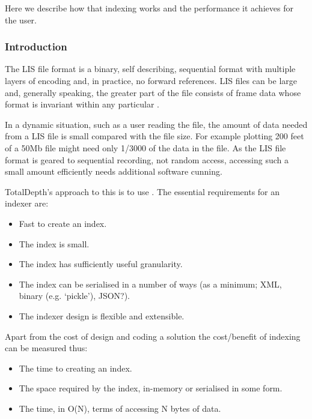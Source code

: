 \documentclass[letterpaper,10pt,english]{sphinxmanual}
\begin{document}
Here we describe how that indexing works and the performance it achieves for the user.


\subsubsection{Introduction}
\label{\detokenize{tech/LIS_indexing:introduction}}
The LIS file format is a binary, self describing, sequential format with multiple layers of encoding and, in practice, no forward references. LIS files can be large and, generally speaking, the greater part of the file consists of frame data whose format is invariant within any particular {\hyperref[\detokenize{glossary:term-log-pass}]{}}.

In a dynamic situation, such as a user reading the file, the  amount of data needed from a LIS file is small compared with the file size. For example plotting 200 feet of a 50Mb file might need only 1/3000 of the data in the file. As the LIS file format is geared to sequential recording, not random access, accessing such a small amount efficiently needs additional software cunning.

TotalDepth’s approach to this is to use . The essential requirements for an indexer are:
\begin{itemize}
\item {} 
Fast to create an index.

\item {} 
The index is small.

\item {} 
The index has sufficiently useful granularity.

\item {} 
The index can be serialised in a number of ways (as a minimum; XML, binary (e.g. ‘pickle’), JSON?).

\item {} 
The indexer design is flexible and extensible.

\end{itemize}

Apart from the cost of design and coding a solution the cost/benefit of indexing can be measured thus:
\begin{itemize}
\item {} 
The time to creating an index.

\item {} 
The space required by the index, in-memory or serialised in some form.

\item {} 
The time, in O(N), terms of accessing N bytes of data.

\end{itemize}
\end{document}
